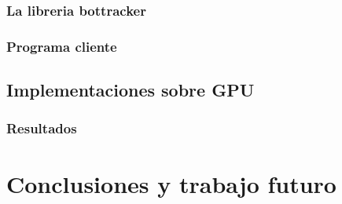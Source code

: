 \documentclass[a4paper,10pt]{report}
\begin{document}
\subsection{La libreria bottracker}

\subsection{Programa cliente}

\section{Implementaciones sobre GPU}

\subsection{Resultados}

\chapter{Conclusiones y trabajo futuro}
\end{document}
